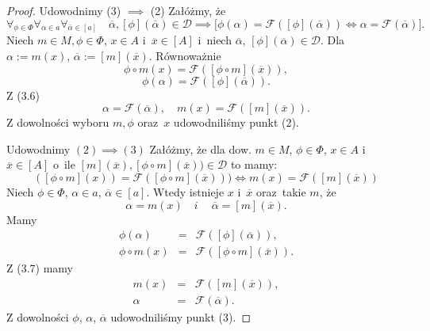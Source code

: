 \documentclass[12pt,a4paper]{report}
\newcommand{\domkniecie}[1]{\left[ {#1} \right] }
\begin{document}
\begin{proof}
Udowodnimy (3) $\implies$ (2)
Załóżmy, że
\begin{equation}
\forall_{\phi \in \Phi}\forall_{\alpha \in a}\forall_{\overline{\alpha} \in \domkniecie{a}} \quad \overline{\alpha}, \domkniecie{\phi}(\overline{\alpha}) \in \mathcal{D} \implies \big[\phi(\alpha)=\mathcal{F}(\domkniecie{\phi}(\overline{\alpha})) \iff \alpha=\mathcal{F}(\overline{\alpha})\big].
\end{equation}
Niech $m\in M, \phi\in \Phi$, $x\in A$ i~$\overline{x} \in \domkniecie{A}$ i~niech $\overline{\alpha}$, $\domkniecie{\phi}(\overline{\alpha}) \in \mathcal{D}$. Dla  $\alpha:= m(x)$, $\overline{\alpha}:=\domkniecie{m}(\overline{x})$. Równoważnie
$$
\phi\circ m(x)=\mathcal{F}(\domkniecie{\phi\circ m}(\overline{x})), 
$$
$$
\phi(\alpha)=\mathcal{F}(\domkniecie{\phi}(\overline{\alpha})).
$$
Z (3.6)
$$
\alpha=\mathcal{F}(\overline{\alpha}), \quad m(x)=\mathcal{F}(\domkniecie{m}(\overline{x})).
$$
Z dowolności wyboru $m, \phi$ oraz~$x$ udowodniliśmy punkt (2).

Udowodnimy $(2) \implies (3)$
Załóżmy, że dla dow. $m \in M$, $\phi \in \Phi$, $ x \in A$ i~$\overline{x} \in \domkniecie{A}$ o~ile $\domkniecie{m}(\overline{x}), \domkniecie{\phi\circ m}(\overline{x})) \in \mathcal{D}$ to mamy:
\begin{equation}
(\domkniecie{\phi\circ m}(x))=\mathcal{F}( \domkniecie{\phi \circ m}(\overline{x}))) \iff m(x)=\mathcal{F}(\domkniecie{m}(\overline{x}))
\end{equation}
Niech $\phi \in \Phi$, $\alpha \in a$, $\overline{\alpha} \in \domkniecie{a}$. Wtedy istnieje $x$ i~$\overline{x}$ oraz~takie $m$, że
$$
\alpha=m(x) \quad i~\quad \overline{\alpha}=\domkniecie{m}(\overline{x}).
$$ 
Mamy
\begin{eqnarray*}
\phi(\alpha) & = & \mathcal{F}(\domkniecie{\phi}(\overline{\alpha})),\\
\phi \circ m(x)&=&\mathcal{F}(\domkniecie{\phi \circ m}(\overline{x})).
\end{eqnarray*}
Z (3.7) mamy
\begin{eqnarray*}
m(x) &=&\mathcal{F}(\domkniecie{m}(\overline{x})),\\
\alpha&=&\mathcal{F}(\overline{\alpha}).
\end{eqnarray*}
Z dowolności $\phi$, $\alpha$, $\overline{\alpha}$ udowodniliśmy punkt (3).
\end{proof}
\end{document}
